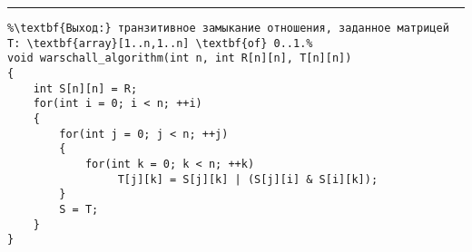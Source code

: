 \documentclass{article}
\begin{document}
\vspace{5pt} \hrule
\begin{lstlisting}[caption={Вычисление транзитивного замыкания отношения}, label=p_58, escapechar=\%]
%\noindent\textbf{Вход:} отношение, заданное матрицей R: \textbf{array}[1..n,1..n] \textbf{of} 0..1.\\%
%\textbf{Выход:} транзитивное замыкание отношения, заданное матрицей T: \textbf{array}[1..n,1..n] \textbf{of} 0..1.%
void warschall_algorithm(int n, int R[n][n], T[n][n])
{
	int S[n][n] = R;
	for(int i = 0; i < n; ++i)
	{
		for(int j = 0; j < n; ++j)
		{
			for(int k = 0; k < n; ++k)
				 T[j][k] = S[j][k] | (S[j][i] & S[i][k]);
		}
		S = T;
	}
}
\end{lstlisting}
\end{document}
